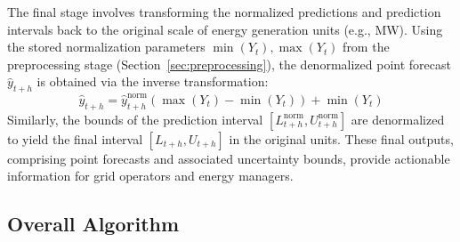 \documentclass[review,3p,times]{elsarticle}
\begin{document}
The final stage involves transforming the normalized predictions and prediction intervals back to the original scale of energy generation units (e.g., MW). Using the stored normalization parameters $\min(Y_t), \max(Y_t)$ from the preprocessing stage (Section~\ref{sec:preprocessing}), the denormalized point forecast $\hat{y}_{t+h}$ is obtained via the inverse transformation:
\begin{equation}
    \hat{y}_{t+h} = \hat{y}_{t+h}^{\text{norm}} (\max(Y_t) - \min(Y_t)) + \min(Y_t)
\end{equation}
Similarly, the bounds of the prediction interval $[L_{t+h}^{\text{norm}}, U_{t+h}^{\text{norm}}]$ are denormalized to yield the final interval $[L_{t+h}, U_{t+h}]$ in the original units. These final outputs, comprising point forecasts and associated uncertainty bounds, provide actionable information for grid operators and energy managers.

\subsection{Overall Algorithm}
\label{sec:overall_algorithm}
\end{document}
